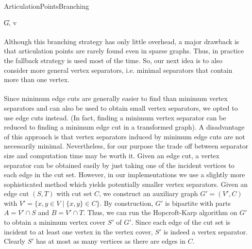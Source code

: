 \documentclass[]{article}
\begin{document}
\begin{algorithm}
	\caption{ArticulationPointsBranching}\label{alg:artic_strat}
	\DontPrintSemicolon
	
	
	\U{G, v}	
	
	
\end{algorithm}



\paragraph{}
Although this branching strategy has only little overhead, a major drawback  is that articulation points are rarely found even in sparse graphs. Thus, in practice the fallback strategy is used most of the time. So, our next idea is to also consider more general vertex separators, i.e. minimal separators that contain more than one vertex. 
\paragraph{}
Since minimum edge cuts are generally easier to find than minimum vertex separators and can also be used to obtain small vertex separators, we opted to use edge cuts instead. (In fact, finding a minimum vertex separator can be reduced to finding a minimum edge cut in a transformed graph). A disadvantage of this approach is that vertex separators induced by minimum edge cuts are not necessarily minimal. Nevertheless, for our purpose the trade off between separator size and computation time may be worth it. Given an edge cut, a vertex separator can be obtained easily by just taking one of the incident vertices to each edge in the cut set. However, in our implementations we use a slightly more sophisticated method which yields potentially smaller vertex separators. Given an edge cut $(S,T)$ with cut set $C$, we construct an auxiliary graph $G'=(V',C)$  with $V' = \{x,y\in V\;|\;\{x,y\}\in C\}$. By construction, $G'$ is bipartite with parts $A = V'\cap S$ and $B = V'\cap T$. Thus, we can run the Hopcroft-Karp algorithm \cite{bibid} on $G'$ to obtain a minimum vertex cover $S'$ of $G'$. Since each edge of the cut set is incident to at least one vertex in the vertex cover, $S'$ is indeed a vertex separator. Clearly $S'$ has at most as many vertices as there are edges in $C$.
\end{document}

